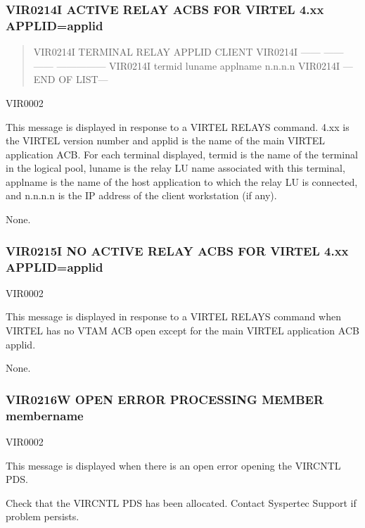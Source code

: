 \documentclass[letterpaper,10pt,english]{sphinxmanual}
\begin{document}
\subsubsection{VIR0214I ACTIVE RELAY ACBS FOR VIRTEL 4.xx APPLID=applid}
\label{\detokenize{messages:vir0214i-active-relay-acbs-for-virtel-4-xx-applid-applid}}\begin{quote}

\sphinxAtStartPar
VIR0214I TERMINAL RELAY    APPLID  CLIENT
VIR0214I ——\textendash{} ——\textendash{} ——\textendash{} —————
VIR0214I termid luname  applname n.n.n.n VIR0214I —END OF LIST—
\end{quote}
\begin{description}
\sphinxAtStartPar
VIR0002

\sphinxAtStartPar
This message is displayed in response to a VIRTEL RELAYS command. 4.xx is the VIRTEL version number and applid is the name of the main VIRTEL application ACB. For each terminal displayed, termid is the name of the terminal in the logical pool, luname is the relay LU name associated with this terminal, applname is the name of the host application to which the relay LU is connected, and n.n.n.n is the IP address of the client workstation (if any).

\sphinxAtStartPar
None.

\end{description}


\subsubsection{VIR0215I NO ACTIVE RELAY ACBS FOR VIRTEL 4.xx APPLID=applid}
\label{\detokenize{messages:vir0215i-no-active-relay-acbs-for-virtel-4-xx-applid-applid}}\begin{description}
\sphinxAtStartPar
VIR0002

\sphinxAtStartPar
This message is displayed in response to a VIRTEL RELAYS command when VIRTEL has no VTAM ACB open except for the main VIRTEL application ACB applid.

\sphinxAtStartPar
None.

\end{description}


\subsubsection{VIR0216W  OPEN ERROR PROCESSING MEMBER membername}
\label{\detokenize{messages:vir0216w-open-error-processing-member-membername}}\begin{description}
\sphinxAtStartPar
VIR0002

\sphinxAtStartPar
This message is displayed when there is an open error opening the VIRCNTL PDS.

\sphinxAtStartPar
Check that the VIRCNTL PDS has been allocated. Contact Syspertec Support if problem persists.

\end{description}
\end{document}

